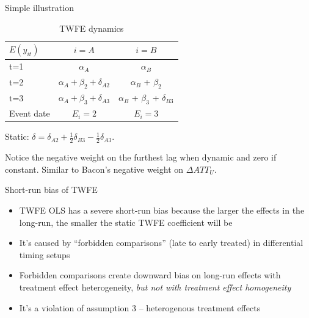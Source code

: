 \documentclass{beamer}
\begin{document}
\begin{frame}{Simple illustration}


\begin{table}[htb]\centering
\scriptsize
\caption{TWFE dynamics}
\centering
\begin{threeparttable}
\begin{tabular}{l*{2}{c}}
\toprule
\multicolumn{1}{l}{$E(y_{it})$ }&
\multicolumn{1}{c}{\textbf{$i=A$ }}&
\multicolumn{1}{c}{\textbf{$i=B$ }}\\
\midrule
t=1 & $\alpha_A$ & $\alpha_B$ \\
t=2 & $\alpha_A + \beta_2 + \delta_{A2}$ & $\alpha_B$ + $\beta_2$ \\
t=3 & $\alpha_A + \beta_3 + \delta_{A3}$ & $\alpha_B$ + $\beta_3$ + $\delta_{B3}$ \\
\midrule
Event date & $E_i=2$ & $E_i = 3$ \\
\bottomrule
\end{tabular}
\end{threeparttable}
\end{table}

Static: $\delta = \delta_{A2} + \frac{1}{2}\delta_{B3} - \frac{1}{2} \delta_{A3}$.  \\

\bigskip

Notice the negative weight on the furthest lag when dynamic and zero if constant. Similar to Bacon's negative weight on $\Delta ATT_U$.

\end{frame}


\begin{frame}{Short-run bias of TWFE}

\begin{itemize}
\item TWFE OLS has a severe short-run bias because the larger the effects in the long-run, the smaller the static TWFE coefficient will be
\item It's caused by ``forbidden comparisons'' (late to early treated) in differential timing setups
\item Forbidden comparisons create downward bias on long-run effects with treatment effect heterogeneity, \emph{but not with treatment effect homogeneity} 
\item It's a violation of assumption 3 -- heterogenous treatment effects
\end{itemize}

\end{frame}
\end{document}
